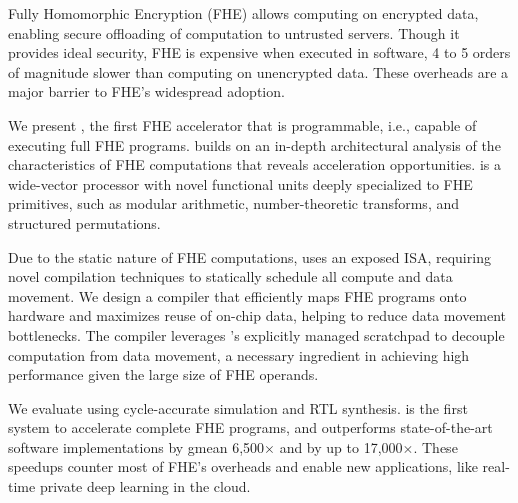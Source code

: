 
Fully Homomorphic Encryption (FHE) allows computing on encrypted data, enabling secure offloading of computation to untrusted servers.
Though it provides ideal security, FHE is expensive when executed in software, 4 to 5 orders of magnitude slower than computing on unencrypted data.
These overheads are a major barrier to FHE's widespread adoption.

We present \name, the first FHE accelerator that is programmable, i.e., capable of executing full FHE programs.
\name builds on an in-depth architectural analysis of the characteristics of FHE computations
that reveals acceleration opportunities. \name is a wide-vector processor with novel functional units deeply specialized to FHE primitives, 
such as modular arithmetic, number-theoretic transforms, and structured permutations.

Due to the static nature of FHE computations, \name uses an exposed ISA, requiring novel compilation techniques to statically schedule all compute and data movement. We design a compiler that efficiently maps FHE programs onto \name hardware and maximizes reuse of on-chip data, helping to reduce data movement bottlenecks. 
The compiler leverages \name's explicitly managed scratchpad to decouple computation from data movement, a necessary ingredient in achieving high performance given the large size of FHE operands.

 
We evaluate \name using cycle-accurate simulation and RTL synthesis.
\name is the first system to accelerate complete FHE programs,
and outperforms state-of-the-art software implementations by gmean 6,500$\times$ and by up to 17,000$\times$.
These speedups counter most of FHE's overheads and enable new applications, like real-time private deep learning in the cloud.
